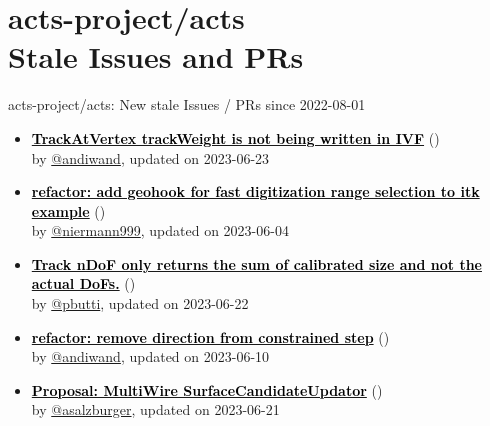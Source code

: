 \section{ acts-project/acts \\ Stale Issues and PRs}
\begin{frame}[allowframebreaks]{ acts-project/acts: New stale Issues / PRs since 2022-08-01 }
  \begin{itemize}
    
    \item\iss\prstale\textbf{\href{https://github.com/acts-project/acts/issues/2149}{\textcolor{black}{TrackAtVertex trackWeight is not being written in IVF}}}
    (\href{https://github.com/acts-project/acts/issues/2149}{}) \\
    by \href{https://github.com/andiwand}{@andiwand}, updated on 2023-06-23

    \item\propen\prwip\prstale\textbf{\href{https://github.com/acts-project/acts/pull/2089}{\textcolor{black}{refactor: add geohook for fast digitization range selection to itk example}}}
    (\href{https://github.com/acts-project/acts/pull/2089}{}) \\
    by \href{https://github.com/niermann999}{@niermann999}, updated on 2023-06-04

    \item\iss\prstale\textbf{\href{https://github.com/acts-project/acts/issues/2076}{\textcolor{black}{Track nDoF only returns the sum of calibrated size and not the actual DoFs.}}}
    (\href{https://github.com/acts-project/acts/issues/2076}{}) \\
    by \href{https://github.com/pbutti}{@pbutti}, updated on 2023-06-22

    \item\propen\prwip\prstale\textbf{\href{https://github.com/acts-project/acts/pull/2073}{\textcolor{black}{refactor: remove direction from constrained step}}}
    (\href{https://github.com/acts-project/acts/pull/2073}{}) \\
    by \href{https://github.com/andiwand}{@andiwand}, updated on 2023-06-10

    \item\iss\prstale\textbf{\href{https://github.com/acts-project/acts/issues/2063}{\textcolor{black}{Proposal: MultiWire SurfaceCandidateUpdator}}}
    (\href{https://github.com/acts-project/acts/issues/2063}{}) \\
    by \href{https://github.com/asalzburger}{@asalzburger}, updated on 2023-06-21


\end{itemize}
\end{frame}
